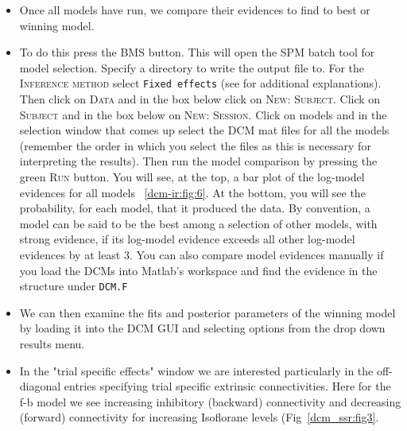 \begin{itemize}
\item Once all models have run, we compare their evidences to find to best or winning model.
\item To do this press the \textsc{BMS} button. This will open the SPM batch tool for model selection. Specify a directory to write the output file to.  For the \textsc{Inference method} select \texttt{Fixed effects} (see \cite{klaas_bms} for additional explanations). Then click on \textsc{Data} and in the box below click on \textsc{New: Subject}. Click on \textsc{Subject} and in the box below on \textsc{New: Session}. Click on models and in the selection window that comes up select the DCM mat files for all the models (remember the order in which you select the files as this is necessary for interpreting the results). Then run the model comparison by pressing the green \textsc{Run} button. You will see, at the top, a bar plot of the log-model evidences for all models ~\ref{dcm-ir:fig:6}. At the bottom, you will see the probability, for each model, that it produced the data. By convention, a model can be said to be the best among a selection of other models, with strong evidence, if its log-model evidence exceeds all other log-model evidences by at least 3. You can also compare model evidences manually if you load the DCMs into Matlab's workspace and find the evidence in the structure under \texttt{DCM.F}
\item We can then examine the fits and posterior parameters of the winning model by loading it into the DCM GUI and selecting options from the drop down results menu.
\item In the "trial specific effects" window we are interested particularly in the off-diagonal entries specifying trial specific extrinsic connectivities. Here for the f-b model we see increasing inhibitory (backward) connectivity and decreasing (forward) connectivity for increasing Isoflorane levels (Fig~\ref{dcm_ssr:fig3}. 
\end{itemize}

